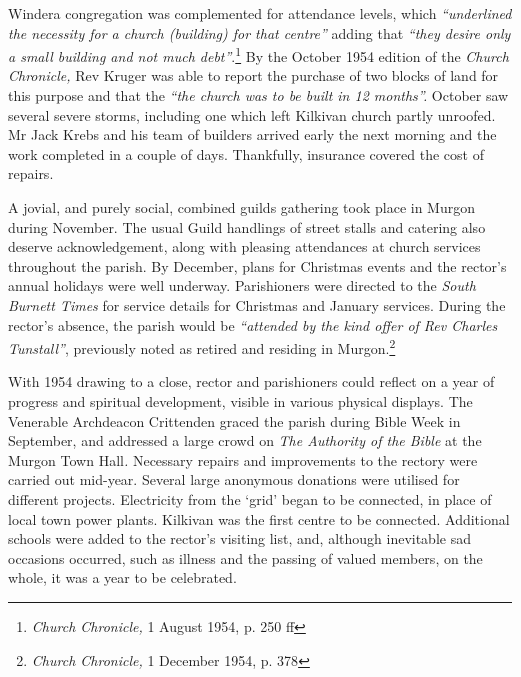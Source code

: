 Windera congregation was complemented for attendance levels, which \emph{``underlined the necessity for a church (building) for that centre''} adding that \emph{``they desire only a small building and not much debt''}.\footnote{\emph{Church Chronicle,} 1 August 1954, p. 250 ff} By the October 1954 edition of the \emph{Church Chronicle,} Rev Kruger was able to report the purchase of two blocks of land for this purpose and that the \emph{``the church was to be built in 12 months''.} October saw several severe storms, including one which left Kilkivan church partly unroofed. Mr Jack Krebs and his team of builders arrived early the next morning and the work completed in a couple of days. Thankfully, insurance covered the cost of repairs.


A jovial, and purely social, combined guilds gathering took place in Murgon during November. The usual Guild handlings of street stalls and catering also deserve acknowledgement, along with pleasing attendances at church services throughout the parish. By December, plans for Christmas events and the rector's annual holidays were well underway. Parishioners were directed to the \emph{South Burnett Times} for service details for Christmas and January services. During the rector's absence, the parish would be \emph{``attended by the kind offer of Rev Charles Tunstall''}, previously noted as retired and residing in Murgon.\footnote{\emph{Church Chronicle,} 1 December 1954, p. 378}


With 1954 drawing to a close, rector and parishioners could reflect on a year of progress and spiritual development, visible in various physical displays. The Venerable Archdeacon Crittenden graced the parish during Bible Week in September, and addressed a large crowd on \emph{The Authority of the Bible} at the Murgon Town Hall\emph{.} Necessary repairs and improvements to the rectory were carried out mid-year. Several large anonymous donations were utilised for different projects. Electricity from the `grid' began to be connected, in place of local town power plants. Kilkivan was the first centre to be connected. Additional schools were added to the rector's visiting list, and, although inevitable sad occasions occurred, such as illness and the passing of valued members, on the whole, it was a year to be celebrated.



